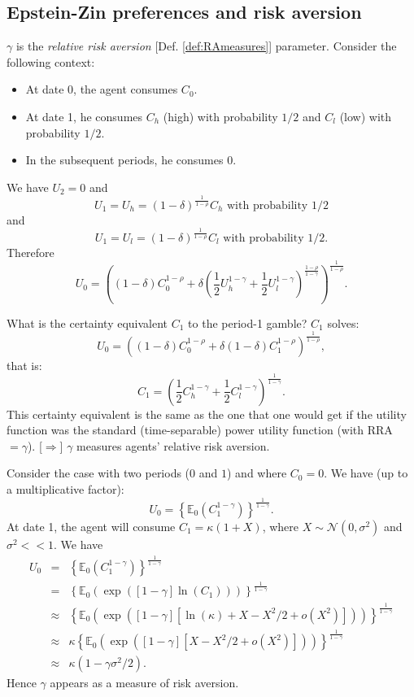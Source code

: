 \documentclass[
  12pt,
]{book}
\providecommand{\tightlist}{%
  \setlength{\itemsep}{0pt}\setlength{\parskip}{0pt}}
\theoremstyle{definition}
\theoremstyle{definition}
\theoremstyle{definition}
\theoremstyle{definition}
\theoremstyle{remark}
\begin{document}
\hypertarget{epstein-zin-preferences-and-risk-aversion}{%
\subsection{Epstein-Zin preferences and risk aversion}\label{epstein-zin-preferences-and-risk-aversion}}

\(\gamma\) is the \emph{relative risk aversion} {[}Def. \ref{def:RAmeasures}{]} parameter.
Consider the following context:

\begin{itemize}
\tightlist
\item
  At date 0, the agent consumes \(C_0\).
\item
  At date 1, he consumes \(C_h\) (high) with probability \(1/2\) and \(C_l\) (low) with probability \(1/2\).
\item
  In the subsequent periods, he consumes 0.
\end{itemize}

We have \(U_2 = 0\) and
\[
U_1 = U_h = (1-\delta)^{\frac{1}{1-\rho}}C_h \mbox{ with probability 1/2}
\]
and
\[
U_1 = U_l = (1-\delta)^{\frac{1}{1-\rho}}C_l \mbox{ with probability 1/2}.
\]
Therefore
\[
U_0 =  \left((1-\delta)C_0^{1-\rho} + \delta \left(\frac{1}{2}U_h^{1-\gamma}+\frac{1}{2}U_l^{1-\gamma}\right)^{\frac{1-\rho}{1-\gamma}}\right)^{\frac{1}{1-\rho}}.
\]

What is the certainty equivalent \(C_1\) to the period-1 gamble? \(C_1\) solves:
\[
U_0 = \left((1-\delta)C_0^{1-\rho} + \delta (1-\delta) C_1^{1-\rho}\right)^{\frac{1}{1-\rho}},
\]
that is:
\[
C_1 = \left(\frac{1}{2}C_h^{1-\gamma}+\frac{1}{2}C_l^{1-\gamma}\right)^{\frac{1}{1-\gamma}}.
\]
This certainty equivalent is the same as the one that one would get if the utility function was the standard (time-separable) power utility function (with RRA \(= \gamma\)).
{[}\(\Rightarrow\){]} \(\gamma\) measures agents' relative risk aversion.

Consider the case with two periods (\(0\) and \(1\)) and where \(C_0=0\). We have (up to a multiplicative factor):
\[
U_0 = \left\{\mathbb{E}_0(C_{1}^{1-\gamma})\right\}^{\frac{1}{1-\gamma}}.
\]
At date 1, the agent will consume \(C_1 = \kappa(1+X)\), where \(X \sim \mathcal{N}(0,\sigma^2)\) and \(\sigma^2<<1\). We have
\begin{eqnarray*}
U_0 &=& \left\{\mathbb{E}_0(C_{1}^{1-\gamma})\right\}^{\frac{1}{1-\gamma}}\\
&=& \left\{\mathbb{E}_0(\exp([1-\gamma]\ln(C_1)))\right\}^{\frac{1}{1-\gamma}}\\
&\approx& \left\{\mathbb{E}_0(\exp([1-\gamma][\ln(\kappa) + X - X^2/2 + o(X^2)]))\right\}^{\frac{1}{1-\gamma}}\\
&\approx& \kappa \left\{\mathbb{E}_0(\exp([1-\gamma][X-X^2/2 + o(X^2)]))\right\}^{\frac{1}{1-\gamma}}\\
&\approx& \kappa (1-\gamma\sigma^2/2).
\end{eqnarray*}
Hence \(\gamma\) appears as a measure of risk aversion.
\end{document}
